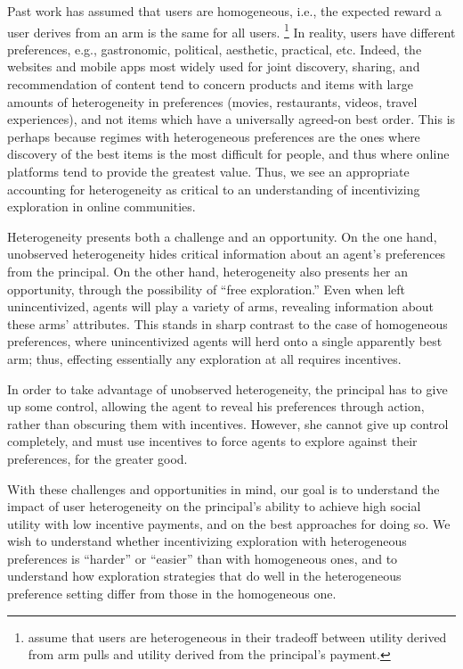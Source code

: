 Past work has assumed that users are homogeneous, i.e., the expected
reward a user derives from an arm is the same for all users.%
\footnote{\citet{han2015incentivizing} assume that users are
heterogeneous in their tradeoff between utility derived from arm pulls
and utility derived from the principal's payment.}
In reality, users have different preferences, e.g., gastronomic,
political, aesthetic, practical, etc.
Indeed, the websites and mobile apps most widely used for joint discovery,
sharing, and recommendation of content tend to concern products and items 
with large amounts of heterogeneity in preferences (movies, restaurants,
videos, travel experiences), and not items which have a universally
agreed-on best order.
This is perhaps because regimes with heterogeneous preferences are the
ones where discovery of the best items is the most difficult for people, 
and thus where online
platforms tend to provide the greatest value.  Thus, we see an appropriate
accounting for heterogeneity as critical to an understanding of incentivizing
exploration in online communities.

Heterogeneity presents both a challenge and an opportunity.
On the one hand, unobserved heterogeneity hides critical
information about an agent's preferences from the principal.
On the other hand, heterogeneity also presents her an opportunity,
through the possibility of ``free exploration.''
Even when left unincentivized, agents will
play a variety of arms, revealing information about these arms' attributes.
This stands in sharp contrast to the case of homogeneous preferences,
where unincentivized agents will herd onto a single apparently best arm;
thus, effecting essentially any exploration at all requires incentives.

In order to take advantage of unobserved heterogeneity,
the principal has to give up some control, allowing the agent to
reveal his preferences through action, rather than obscuring them with
incentives.
However, she cannot give up control completely,
and must use incentives to force agents to explore against their
preferences, for the greater good. 

With these challenges and opportunities in mind, our goal is to understand the
impact of user heterogeneity on the principal's ability to achieve
high social utility with low incentive payments,
and on the best approaches for doing so.
We wish to understand whether incentivizing exploration with
heterogeneous preferences  is ``harder'' or ``easier'' than with
homogeneous ones,
and to understand how exploration strategies that do well in the
heterogeneous preference setting differ from those in the homogeneous one.

